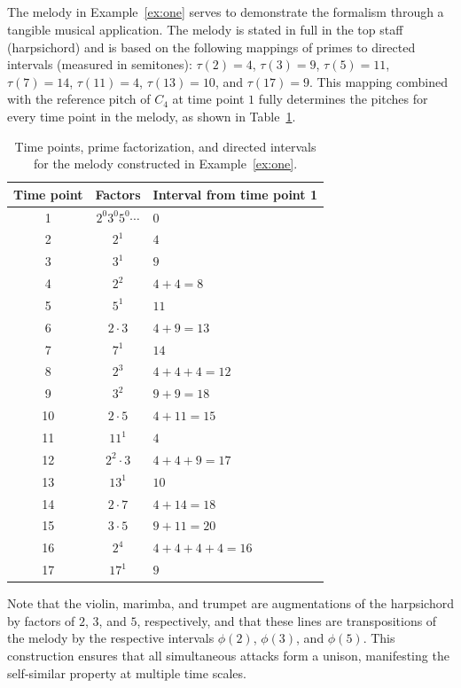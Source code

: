 \documentclass[11pt]{article}
\theoremstyle{plain}
\theoremstyle{definition}
\theoremstyle{remark}
\begin{document}
\subsection{}
\label{sec:2.3}

The melody in Example~\ref{ex:one} serves to demonstrate the formalism through a tangible musical application. The melody is stated in full in the top staff (harpsichord) and is based on the following mappings of primes to directed intervals (measured in semitones): $\tau(2) = 4$,  $\tau(3) = 9$,  $\tau(5) = 11$, $\tau(7) = 14$, $\tau(11)= 4$,  $\tau(13) = 10$, and $\tau(17) = 9$. This mapping combined with the reference pitch of $C_4$ at time point $1$ fully determines the pitches for every time point in the melody, as shown in Table~\ref{tab:intervals}.
\begin{table}[htbp]
  \centering
  \begin{tabular}{@{}ccl@{}}
    \toprule
    Time point & Factors & Interval from time point 1 \\
    \midrule
     1 & $2^{0}3^{0}5^{0}\cdots$ & $0$ \\
     2 & $2^{1}$          & $4$ \\
     3 & $3^{1}$          & $9$ \\
     4 & $2^{2}$          & $4 + 4 = 8$ \\
     5 & $5^{1}$          & $11$ \\
     6 & $2 \cdot 3$      & $4 + 9 = 13$ \\
     7 & $7^{1}$          & $14$ \\
     8 & $2^{3}$          & $4 + 4 + 4 = 12$ \\
     9 & $3^{2}$          & $9 + 9 = 18$ \\
    10 & $2 \cdot 5$      & $4 + 11 = 15$ \\
    11 & $11^{1}$         & $4$ \\
    12 & $2^{2} \cdot 3$  & $4 + 4 + 9 = 17$ \\
    13 & $13^{1}$         & $10$ \\
    14 & $2 \cdot 7$      & $4 + 14 = 18$ \\
    15 & $3 \cdot 5$      & $9 + 11 = 20$ \\
    16 & $2^{4}$          & $4 + 4 + 4 + 4 = 16$ \\
    17 & $17^{1}$         & $9$ \\
    \bottomrule
  \end{tabular}
  \caption{Time points, prime factorization, and directed intervals for the melody constructed in Example~\ref{ex:one}.}
  \label{tab:intervals}
\end{table}
Note that the violin, marimba, and trumpet are augmentations of the
harpsichord by factors of $2$, $3$, and $5$, respectively, and that
these lines are transpositions of the melody by the respective intervals
$\phi(2)$, $\phi(3)$, and $\phi(5)$. This construction ensures that all
simultaneous attacks form a unison, manifesting the self-similar
property at multiple time scales.
\end{document}

